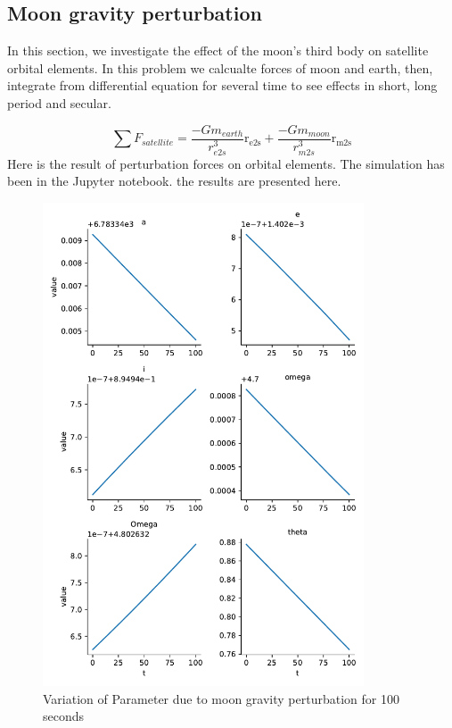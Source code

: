 \subsection{Moon gravity perturbation}
In this section, we investigate the effect of the moon's third body on satellite orbital elements. In this problem we calcualte forces of moon and earth, then, integrate from differential equation for several time to see effects in short, long period and secular.

$$
\sum F_{satellite} = \dfrac{-Gm_{earth}}{r_{e2s}^3} \boldsymbol{\mathrm{r_{e2s}}} + \dfrac{-Gm_{moon}}{r_{m2s}^3} \boldsymbol{\mathrm{r_{m2s}}}
$$
Here is the result of perturbation forces on
orbital elements. The simulation has been in the Jupyter notebook. the results are presented here.

\begin{figure}[H]
    \centering
    \includegraphics[width=0.85\textwidth]{../Figure/Q2/orbital_elements_variation_moon_100}
    \caption{Variation of Parameter due to moon gravity perturbation for 100 seconds}
\end{figure}


